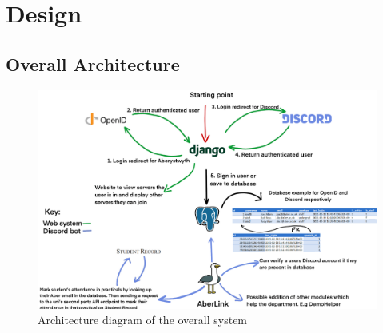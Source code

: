 \chapter{Design}

%
%
%
% 
%

\section{Overall Architecture}
\begin{figure}[H]
	\centering
	\includegraphics[width=1\linewidth]{Figures/aberlink-flowchart-3}
	\caption{Architecture diagram of the overall system}
	\label{fig:architecture}
\end{figure}

